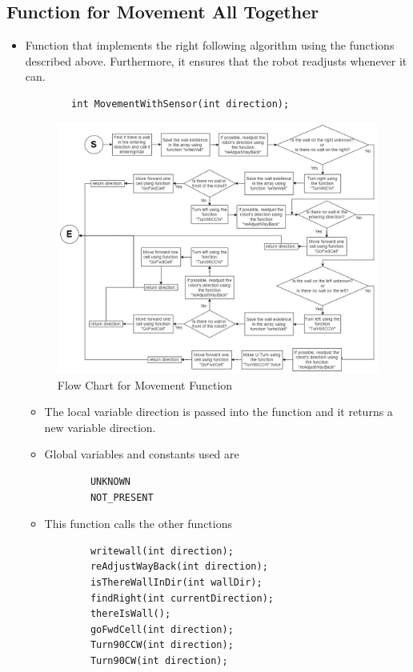 \documentclass[11pt]{article}
\begin{document}
\subsection{Function for Movement All Together}
\begin{itemize}
\item Function that implements the right following algorithm using the functions described above. Furthermore, it ensures that the robot readjusts whenever it can.
	\begin{verbatim}
		int MovementWithSensor(int direction);
	\end{verbatim}
\begin{figure}[htp]
\centering
\includegraphics[scale=0.45]{images/Software_Flowchart/MovementWithSensor.png}
\caption{Flow Chart for Movement Function}
\label{}
\end{figure}
	\begin{itemize}
	\item The local variable direction is passed into the function and it returns a new variable direction.
	\item Global variables and constants used are
	\begin{verbatim}
		UNKNOWN
		NOT_PRESENT
	\end{verbatim}
	\item This function calls the other functions
	\begin{verbatim}
		writewall(int direction);
		reAdjustWayBack(int direction);
		isThereWallInDir(int wallDir);
		findRight(int currentDirection);
		thereIsWall();
		goFwdCell(int direction);
		Turn90CCW(int direction);
		Turn90CW(int direction);
	\end{verbatim}
	\end{itemize}
\end{itemize}
\newpage
\end{document}
